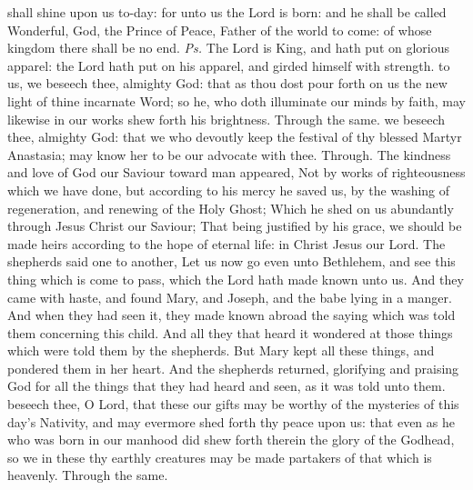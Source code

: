 \introit
{} shall shine upon us to-day: for unto us the Lord is born: and he shall be called Wonderful, God, the Prince of Peace, Father of the world to come: of whose kingdom there shall be no end. \textit{Ps.} The Lord is King, and hath put on glorious apparel: the Lord hath put on his apparel, and girded himself with strength.
\collect
{} to us, we beseech thee, almighty God: that as thou dost pour forth on us the new light of thine incarnate Word; so he, who doth illuminate our minds by faith, may likewise in our works shew forth his brightness. Through the same.
 we beseech thee, almighty God: that we who devoutly keep the festival of thy blessed Martyr Anastasia; may know her to be our advocate with thee. Through.
 The kindness and love of God our Saviour toward man appeared, Not by works of righteousness which we have done, but according to his mercy he saved us, by the washing of regeneration, and renewing of the Holy Ghost; Which he shed on us abundantly through Jesus Christ our Saviour; That being justified by his grace, we should be made heirs according to the hope of eternal life: %
in Christ Jesus our Lord.
 The shepherds said one to another, Let us now go even unto Bethlehem, and see this thing which is come to pass, which the Lord hath made known unto us. And they came with haste, and found Mary, and Joseph, and the babe lying in a manger. And when they had seen it, they made known abroad the saying which was told them concerning this child. And all they that heard it wondered at those things which were told them by the shepherds. But Mary kept all these things, and pondered them in her heart. And the shepherds returned, glorifying and praising God for all the things that they had heard and seen, as it was told unto them.
\secret
{} beseech thee, O Lord, that these our gifts may be worthy of the mysteries of this day's Nativity, and may evermore shed forth thy peace upon us: that even as he who was born in our manhood did shew forth therein the glory of the Godhead, so we in these thy earthly creatures may be made partakers of that which is heavenly. Through the same.

